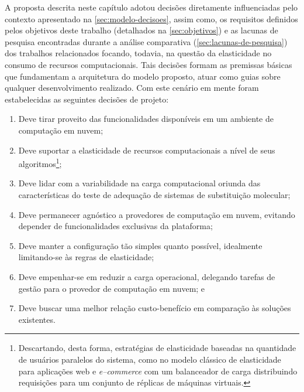 \documentclass[english,brazilian]{UNISINOSmonografia} %
\begin{document}
A proposta descrita neste capítulo adotou decisões diretamente influenciadas pelo contexto apresentado na \autoref{sec:modelo-decisoes}, assim como, os requisitos definidos pelos objetivos deste trabalho (detalhados na \autoref{sec:objetivos}) e as lacunas de pesquisa encontradas durante a análise comparativa (\autoref{sec:lacunas-de-pesquisa}) dos trabalhos relacionados focando, todavia, na questão da elasticidade no consumo de recursos computacionais.
Tais decisões formam as premissas básicas que fundamentam a arquitetura do modelo proposto, atuar como guias sobre qualquer desenvolvimento realizado.
Com este cenário em mente foram estabelecidas as seguintes decisões de projeto:
\begin{enumerate}[label=Decisão~\arabic*:,itemindent=*,leftmargin=*]
	\label{list:decisoes-de-projeto}
	
	\item Deve tirar proveito das funcionalidades disponíveis em um ambiente de computação em nuvem;

	\item Deve suportar a elasticidade de recursos computacionais a nível de seus algoritmos\footnote{
	Descartando, desta forma, estratégias de elasticidade baseadas na quantidade de usuários paralelos do sistema, como no modelo clássico de elasticidade para aplicações web e \textit{e--commerce} com um balanceador de carga distribuindo requisições para um conjunto de réplicas de máquinas virtuais.
};
	
	\item Deve lidar com a variabilidade na carga computacional oriunda das características do teste de adequação de sistemas de substituição molecular;
	
	\item Deve permanecer agnóstico a provedores de computação em nuvem, evitando depender de funcionalidades exclusivas da plataforma;
	
	\item Deve manter a configuração tão simples quanto possível, idealmente limitando-se às regras de elasticidade;

	\item Deve empenhar-se em reduzir a carga operacional, delegando tarefas de gestão para o provedor de computação em nuvem; e

	\item Deve buscar uma melhor relação custo-benefício em comparação às soluções existentes.
\end{enumerate}
\end{document}
